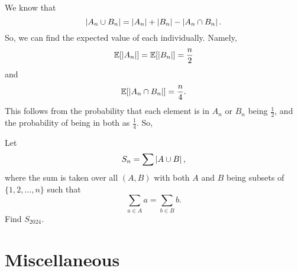 \documentclass[11pt]{scrartcl}
\begin{document}
We know that
\[\left\lvert A_{n} \cup B_{n} \right\rvert = \left\lvert A_{n} \right\rvert + \left\lvert B_{n} \right\rvert - \left\lvert A_{n} \cap B_{n} \right\rvert.\]
So, we can find the expected value of each individually. Namely,
\[\mathbb{E}[\left\lvert A_{n} \right\rvert] = \mathbb{E}[\left\lvert B_{n} \right\rvert] = \frac{n}{2}\]
and
\[\mathbb{E}[\left\lvert A_{n} \cap B_{n} \right\rvert] = \frac{n}{4}.\]
This follows from the probability that each element is in $A_{n}$ or $B_{n}$ being $\frac{1}{2}$, and the probability of being in both as $\frac{1}{4}$. So,

\begin{problem}
    Let
    \[S_{n} = \sum \left\lvert A \cup B \right\rvert,\]
    where the sum is taken over all $(A,B)$ with both $A$ and $B$ being subsets of $\{1, 2, \dots, n\}$ such that
    \[\sum_{a \in A} a = \sum_{b \in B} b.\]
    Find $S_{2024}$.
\end{problem}

\section{Miscellaneous}
\end{document}
